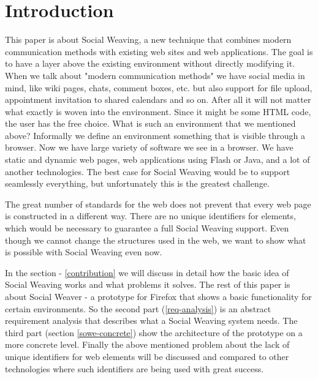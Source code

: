 \section{Introduction}

This paper is about Social Weaving, a new technique that combines modern communication methods with existing web sites and web applications. The goal is to have a layer above the existing environment without directly modifying it. When we talk about "modern communication methods" we have social media in mind, like wiki pages, chats, comment boxes, etc. but also support for file upload, appointment invitation to shared calendars and so on. After all it will not matter what exactly is woven into the environment. Since it might be some HTML code, the user has the free choice. What is such an environment that we mentioned above? Informally we define an environment something that is visible through a browser. Now we have large variety of software we see in a browser. We have static and dynamic web pages, web applications using Flash or Java, and a lot of another technologies. The best case for Social Weaving would be to support seamlessly everything, but unfortunately this is the greatest challenge. 

The great number of standards for the web does not prevent that every web page is constructed in a different way. There are no unique identifiers for elements, which would be necessary to guarantee a full Social Weaving support. Even though we cannot change the structures used in the web, we want to show what is possible with Social Weaving even now. 

In the section  - \ref{contribution} we will discuss in detail how the basic idea of Social Weaving works and what problems it solves. The rest of this paper is about Social Weaver - a prototype for Firefox that shows a basic functionality for certain environments. So the second part (\ref{req-analysis}) is an abstract requirement analysis that describes what a Social Weaving system needs. The third part (section \ref{sowe-concrete}) show the architecture of the prototype on a more concrete level. Finally the above mentioned problem about the lack of unique identifiers for web elements will be discussed and compared to other technologies where such identifiers are being used with great success. 